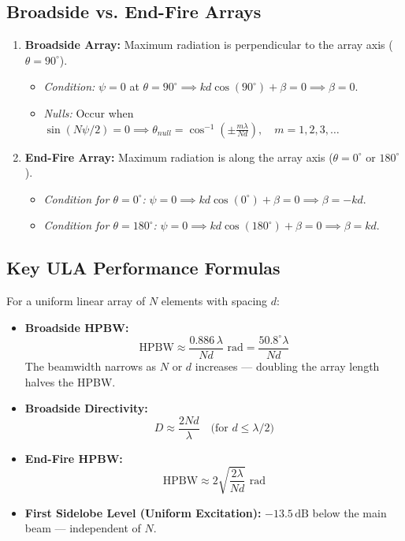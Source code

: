 \documentclass[12pt,a4paper]{article}
\begin{document}
\subsection{Broadside vs. End-Fire Arrays}
\begin{enumerate}[label=\textbf{\arabic*.}, leftmargin=*, itemsep=4pt]
  \item \textbf{Broadside Array:} Maximum radiation is perpendicular to the array axis ($\theta = 90^\circ$).
    \begin{itemize}[leftmargin=*, itemsep=1pt]
      \item \textit{Condition:} $\psi = 0$ at $\theta = 90^\circ \implies kd\cos(90^\circ) + \beta = 0 \implies \beta = 0$.
      \item \textit{Nulls:} Occur when $\sin(N\psi/2) = 0 \implies \theta_{null} = \cos^{-1}\left( \pm \frac{m\lambda}{Nd} \right), \quad m = 1, 2, 3, \dots$
    \end{itemize}
  \item \textbf{End-Fire Array:} Maximum radiation is along the array axis ($\theta = 0^\circ$ or $180^\circ$).
    \begin{itemize}[leftmargin=*, itemsep=1pt]
      \item \textit{Condition for $\theta = 0^\circ$:} $\psi = 0 \implies kd\cos(0^\circ) + \beta = 0 \implies \beta = -kd$.
      \item \textit{Condition for $\theta = 180^\circ$:} $\psi = 0 \implies kd\cos(180^\circ) + \beta = 0 \implies \beta = kd$.
    \end{itemize}
\end{enumerate}

\subsection{Key ULA Performance Formulas}
For a uniform linear array of $N$ elements with spacing $d$:
\begin{itemize}[leftmargin=*, itemsep=3pt]
  \item \textbf{Broadside HPBW:}
  \[
  \text{HPBW} \approx \frac{0.886\,\lambda}{N d} \text{ rad} = \frac{50.8^\circ \lambda}{Nd}
  \]
  The beamwidth narrows as $N$ or $d$ increases — doubling the array length halves the HPBW.
  \item \textbf{Broadside Directivity:}
  \[
  D \approx \frac{2Nd}{\lambda} \quad \text{(for } d \le \lambda/2 \text{)}
  \]
  \item \textbf{End-Fire HPBW:}
  \[
  \text{HPBW} \approx 2\sqrt{\frac{2\lambda}{Nd}} \text{ rad}
  \]
  \item \textbf{First Sidelobe Level (Uniform Excitation):} $-13.5\,\text{dB}$ below the main beam — independent of $N$.
\end{itemize}
\end{document}
